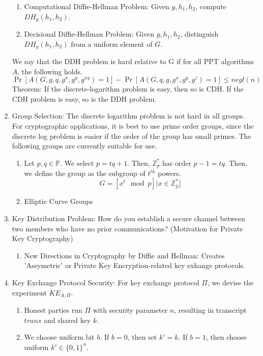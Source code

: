 \documentclass[12pt,letterpaper]{article}
\begin{document}
\begin{enumerate}
            \begin{enumerate}
            	\item Computational Diffie-Hellman Problem: Given $g,h_1,h_2$, compute $DH_g(h_1,h_2)$.
            	\item Decisional Diffie-Hellman Problem: Given $g,h_1,h_2$, distinguish $DH_g(h_1,h_2)$ from a uniform element of $G$.
            \end{enumerate}
		We say that the DDH problem is hard relative to G if for all PPT algorithms $A$, the following holds.
            	\[\Pr[A(G,g,q,g^x,g^y,g^{xy})=1]-\Pr[A(G,q,g,g^x,g^y,g^z)=1]\leq negl(n)\]
           Theorem: If the discrete-logarithm problem is easy, then so is CDH. If the CDH problem is easy, so is the DDH problem.\newpage
           \item Group Selection: The discrete logarithm problem is not hard in all groups. For cryptographic applications, it is best to use prime order groups, since the discrete log problem is easier if the order of the group has small primes. The following groups are currently suitable for use.
           	\begin{enumerate}
           		\item Let $p,q\in\mathbb{P}$. We select $p=tq+1$. Then, $\mathbb{Z}_p^*$ has order $p-1=tq$. Then, we define the group as the subgroup of $t^{th}$ powers.
           		\[G=[x^t\mod p]|x\in\mathbb{Z^*_p}]\] 
           		\item Elliptic Curve Groups
           	\end{enumerate}
   		\item Key Distribution Problem: How do you establish a secure channel between two members who have no prior communications? (Motivation for Private Key Cryptography)
   		\begin{enumerate}
   			\item New Directions in Cryptography by Diffie and Hellman: Creates 'Assymetric' or Private Key Encryption-related key exhange protocols. 
   		\end{enumerate}
   		\item Key Exchange Protocol Security: For key exchange protocol $\Pi$, we devise the experiment $KE_{A,\Pi}$.
   		\begin{enumerate}
   			\item Honest parties run $\Pi$ with security parameter $n$, resulting in transcript $trans$ and shared key $k$.
   			\item We choose uniform bit $b$. If $b=0$, then set $k'=k$. If $b=1$, then choose uniform $k'\in\{0,1\}^n$.

\end{enumerate}
\end{enumerate}
\end{document}

